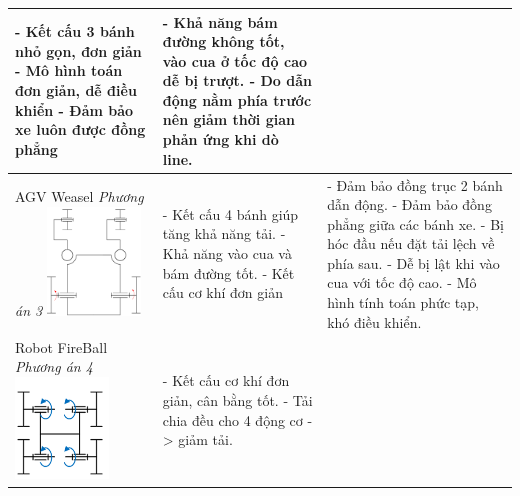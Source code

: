 \begin{longtable}{|p{4cm}|p{5cm}|p{5cm}|}
                - Kết cấu 3 bánh nhỏ gọn, đơn giản \newline
                - Mô hình toán đơn giản, dễ điều khiển \newline
                - Đảm bảo xe luôn được đồng phẳng & 
                - Khả năng bám đường không tốt, vào cua ở tốc độ cao dễ bị trượt. \newline
                - Do dẫn động nằm phía trước nên giảm thời gian phản ứng khi dò line. \\
                \hline
                AGV Weasel \newline
                \textit{Phương án 3} \newline
                \includegraphics[width=2.5cm]{pictures/chapter2/chapter2_pic_3.png} & 
                - Kết cấu 4 bánh giúp tăng khả năng tải. \newline
                - Khả năng vào cua và bám đường tốt. \newline
                - Kết cấu cơ khí đơn giản & 
                - Đảm bảo đồng trục 2 bánh dẫn động. \newline
                - Đảm bảo đồng phẳng giữa các bánh xe. \newline
                - Bị hóc đầu nếu đặt tải lệch về phía sau. \newline
                - Dễ bị lật khi vào cua với tốc độ cao. \newline
                - Mô hình tính toán phức tạp, khó điều khiển. \\
                \hline
                Robot FireBall \newline
                \textit{Phương án 4} \newline
                \includegraphics[width=2.5cm]{pictures/chapter2/chapter2_pic_4.png} &
                - Kết cấu cơ khí đơn giản, cân bằng tốt. \newline
                - Tải chia đều cho 4 động cơ -> giảm tải. \newline

\end{longtable}
